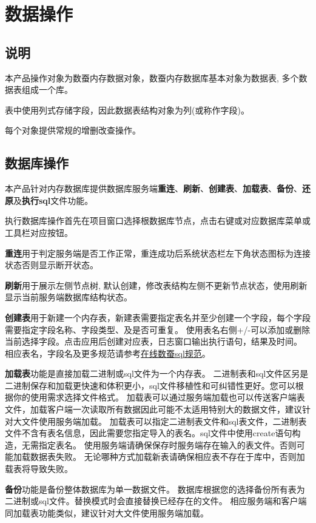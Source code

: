 \section{数据操作}\label{dataop}

\linespread{1.2}
\large
\subsection{说明}
本产品操作对象为数蚕内存数据对象，数蚕内存数据库基本对象为数据表, 多个数据表组成一个库。

表中使用列式存储字段，因此数据表结构对象为列(或称作字段)。

每个对象提供常规的增删改查操作。

\subsection{数据库操作}
\bigskip
本产品针对内存数据库提供数据库服务端\textbf{重连}、\textbf{刷新}、\textbf{创建表}、\textbf{加载表}、\textbf{备份}、\textbf{还原}及\textbf{执行sql}文件功能。

执行数据库操作首先在项目窗口选择根数据库节点，点击右键或对应数据库菜单或工具栏对应按钮。

\textbf{重连}用于判定服务端是否工作正常，重连成功后系统状态栏左下角状态图标为连接状态否则显示断开状态。

\textbf{刷新}用于展示左侧节点树, 默认创建，修改表结构左侧不更新节点状态，使用刷新显示当前服务端数据库结构状态。

\textbf{创建表}用于新建一个内存表，新建表需要指定表名并至少创建一个字段，每个字段需要指定字段名称、字段类型、及是否可重复。
使用表名右侧+/-可以添加或删除当前选择字段。点击应用后创建对应表，日志窗口输出执行语句，结果及时间。
相应表名，字段名及更多规范请参考\href{http://www.shucantech.com/zh/sql_ref_0.2.0.html}{在线数蚕sql规范}。

\textbf{加载表}功能是直接加载二进制或sql文件为一个内存表。
二进制表和sql文件区另是二进制保存和加载更快速和体积更小，sql文件移植性和可纠错性更好。您可以根据你的使用需求选择文件格式。
加载表可以通过服务端加载也可以传送客户端表文件，加载客户端一次读取所有数据因此可能不太适用特别大的数据文件，建议针对大文件使用服务端加载。
加载表可以指定二进制表文件和sql表文件，二进制表文件不含有表名信息，因此需要您指定导入的表名。sql文件中使用create语句构造，无需指定表名。
使用服务端请确保保存时服务端存在输入的表文件。否则可能加载数据表失败。
无论哪种方式加载新表请确保相应表不存在于库中，否则加载表将导致失败。

\textbf{备份}功能是备份整体数据库为单一数据文件。
数据库根据您的选择备份所有表为二进制或sql文件。替换模式时会直接替换已经存在的文件。
相应服务端和客户端同加载表功能类似，建议针对大文件使用服务端加载。

